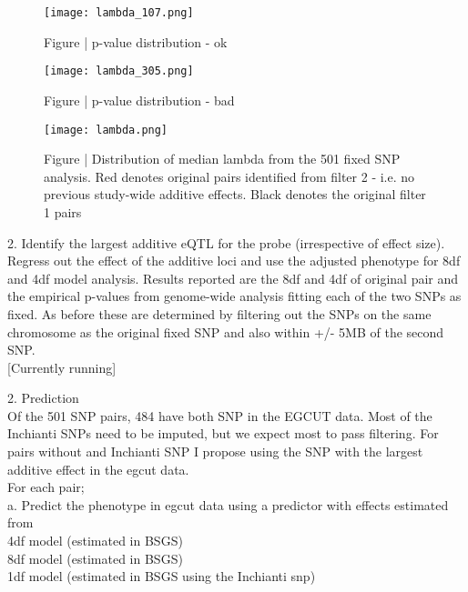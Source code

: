 \documentclass[paper=a4, fontsize=11pt]{scrartcl}					%
\numberwithin{equation}{section}									%
\numberwithin{figure}{section}										%
\numberwithin{table}{section}										%
\begin{document}
\newpage

\begin{figure}[H]
\centering
\texttt{[image: lambda\_107.png]}
\caption*{Figure | p-value distribution - ok}
\end{figure}

\begin{figure}[H]
\centering
\texttt{[image: lambda\_305.png]}
\caption*{Figure | p-value distribution - bad}
\end{figure}


\begin{figure}[H]
\centering
\texttt{[image: lambda.png]}
\caption*{Figure | Distribution of median lambda from the 501 fixed SNP analysis. Red denotes original pairs identified from filter 2 - i.e. no previous study-wide additive effects. Black denotes the original filter 1 pairs}
\end{figure}

\newpage

2. Identify the largest additive eQTL for the probe (irrespective of effect size). Regress out the effect of the additive loci and use the adjusted phenotype for 8df and 4df model analysis. Results reported are the 8df and 4df of original pair and the empirical p-values from genome-wide analysis fitting each of the two SNPs as fixed. As before these are determined by filtering out the SNPs on the same chromosome as the original fixed SNP and also within +/- 5MB of the second SNP. \\

[Currently running]

\vspace{1cm}

2. Prediction \\

Of the 501 SNP pairs, 484 have both SNP in the EGCUT data. Most of the Inchianti SNPs need to be imputed, but we expect most to pass filtering. For pairs without and Inchianti SNP I propose using the SNP with the largest additive effect in the egcut data. \\

For each pair; \\

a. Predict the phenotype in egcut data using a predictor with effects estimated from \\

4df model (estimated in BSGS) \\
8df model (estimated in BSGS) \\
1df model (estimated in BSGS using the Inchianti snp) \\
\end{document}
